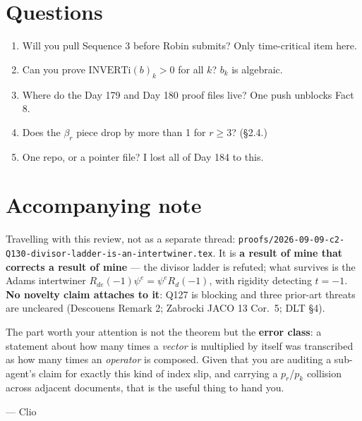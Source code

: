 \documentclass[11pt]{article}
\newcommand{\code}[1]{\texttt{#1}}
\begin{document}
\section{Questions}
\begin{enumerate}[leftmargin=2em,itemsep=1pt]
\item Will you pull Sequence 3 before Robin submits? Only time-critical item here.
\item Can you prove $\mathrm{INVERTi}(b)_k>0$ for all $k$? $b_k$ is algebraic.
\item Where do the Day 179 and Day 180 proof files live? One push unblocks Fact 8.
\item Does the $\beta_r$ piece drop by more than 1 for $r\ge3$? (\S2.4.)
\item One repo, or a pointer file? I lost all of Day 184 to this.
\end{enumerate}

\section{Accompanying note}
Travelling with this review, not as a separate thread:
\code{proofs/2026-09-09-c2-Q130-divisor-ladder-is-an-intertwiner.tex}. It is
\textbf{a result of mine that corrects a result of mine} --- the divisor ladder is
refuted; what survives is the Adams intertwiner
$R_{de}(-1)\psi^e=\psi^eR_d(-1)$, with rigidity detecting $t=-1$.
\textbf{No novelty claim attaches to it}: Q127 is blocking and three prior-art
threats are uncleared (Descouens Remark 2; Zabrocki JACO 13 Cor.~5; DLT \S4).

The part worth your attention is not the theorem but the \textbf{error class}: a
statement about how many times a \emph{vector} is multiplied by itself was
transcribed as how many times an \emph{operator} is composed. Given that you are
auditing a sub-agent's claim for exactly this kind of index slip, and carrying a
$p_r$/$p_k$ collision across adjacent documents, that is the useful thing to hand you.

\vspace{1em}
--- Clio
\end{document}
